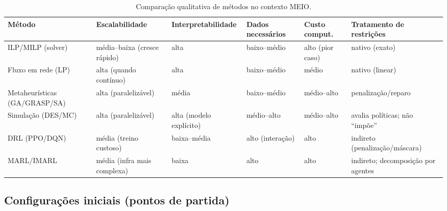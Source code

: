 \begin{table}[htbp]
\centering
\small
\renewcommand{\arraystretch}{1.15}
\begin{tabular}{p{} p{} p{} p{} p{} p{}}
\toprule
\textbf{Método} & \textbf{Escalabilidade} & \textbf{Interpretabilidade} & \textbf{Dados necessários} & \textbf{Custo comput.} & \textbf{Tratamento de restrições} \\
\midrule
ILP/MILP (solver) & média--baixa (cresce rápido) & alta & baixo--médio & alto (pior caso) & nativo (exato) \\
Fluxo em rede (LP) & alta (quando contínuo) & alta & baixo--médio & médio & nativo (linear) \\
Metaheurísticas (GA/GRASP/SA) & alta (paralelizável) & média & baixo--médio & médio--alto & penalização/reparo \\
Simulação (DES/MC) & alta (paralelizável) & alta (modelo explícito) & médio--alto & médio--alto & avalia políticas; não ``impõe'' \\
DRL (PPO/DQN) & média (treino custoso) & baixa--média & alto (interação) & alto & indireto (penalização/máscara) \\
MARL/IMARL & média (infra mais complexa) & baixa & alto & alto & indireto; decomposição por agentes \\
\bottomrule
\end{tabular}
\caption{Comparação qualitativa de métodos no contexto MEIO.}
\label{tab:comparacao_metodos}
\end{table}

\subsection{Configurações iniciais (pontos de partida)}

